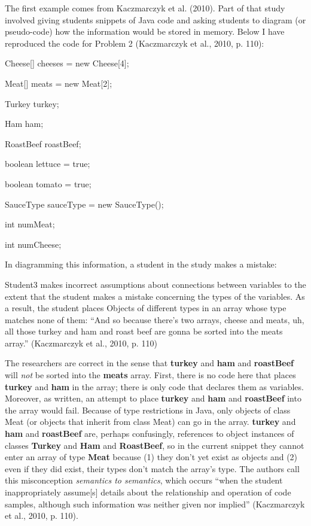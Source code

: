 The first example comes from Kaczmarczyk et al. (2010). Part of that
study involved giving students snippets of Java code and asking students
to diagram (or pseudo-code) how the information would be stored in
memory. Below I have reproduced the code for Problem 2 (Kaczmarczyk et
al., 2010, p. 110):

Cheese{[}{]} cheeses = new Cheese{[}4{]};

Meat{[}{]} meats = new Meat{[}2{]};

Turkey turkey;

Ham ham;

RoastBeef roastBeef;

boolean lettuce = true;

boolean tomato = true;

SauceType sauceType = new SauceType();

int numMeat;

int numCheese;

In diagramming this information, a student in the study makes a mistake:

Student3 makes incorrect assumptions about connections between variables
to the extent that the student makes a mistake concerning the types of
the variables. As a result, the student places Objects of different
types in an array whose type matches none of them: ``And so because
there's two arrays, cheese and meats, uh, all those turkey and ham and
roast beef are gonna be sorted into the meats array.'' (Kaczmarczyk et
al., 2010, p. 110)

The researchers are correct in the sense that \textbf{turkey} and
\textbf{ham} and \textbf{roastBeef} will \emph{not} be sorted into the
\textbf{meats} array. First, there is no code here that places
\textbf{turkey} and \textbf{ham} in the array; there is only code that
declares them as variables. Moreover, as written, an attempt to place
\textbf{turkey} and \textbf{ham} and \textbf{roastBeef} into the array
would fail. Because of type restrictions in Java, only objects of class
Meat (or objects that inherit from class Meat) can go in the array.
\textbf{turkey} and \textbf{ham} and \textbf{roastBeef} are, perhaps
confusingly, references to object instances of classes \textbf{Turkey}
and \textbf{Ham} and \textbf{RoastBeef}, so in the current snippet they
cannot enter an array of type \textbf{Meat} because (1) they don't yet
exist as objects and (2) even if they did exist, their types don't match
the array's type. The authors call this misconception \emph{semantics to
semantics}, which occurs ``when the student inappropriately
assume{[}s{]} details about the relationship and operation of code
samples, although such information was neither given nor implied''
(Kaczmarczyk et al., 2010, p. 110).

